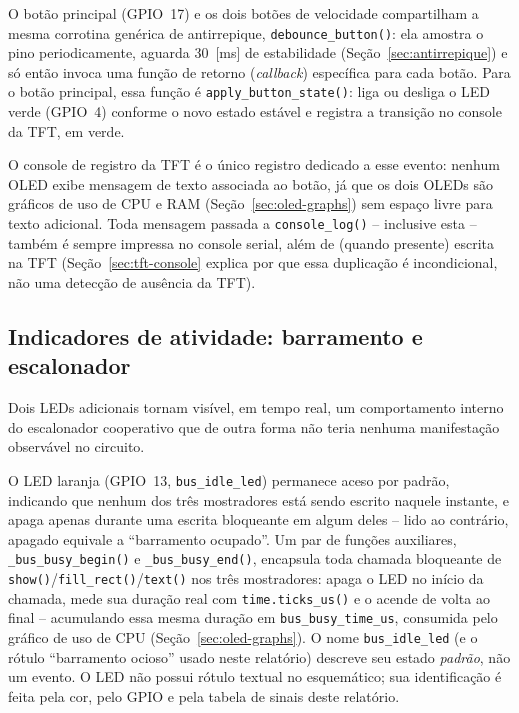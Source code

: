 \documentclass[12pt,a4paper]{article}
\begin{document}
O botão principal (GPIO~17) e os dois botões de velocidade compartilham a mesma corrotina genérica de antirrepique, \texttt{debounce\_button()}: ela amostra o pino periodicamente, aguarda 30~[ms] de estabilidade (Seção~\ref{sec:antirrepique}) e só então invoca uma função de retorno (\textit{callback}) específica para cada botão. Para o botão principal, essa função é \texttt{apply\_button\_state()}: liga ou desliga o LED verde (GPIO~4) conforme o novo estado estável e registra a transição no console da TFT, em verde.

O console de registro da TFT é o único registro dedicado a esse evento: nenhum OLED exibe mensagem de texto associada ao botão, já que os dois OLEDs são gráficos de uso de CPU e RAM (Seção~\ref{sec:oled-graphs}) sem espaço livre para texto adicional. Toda mensagem passada a \texttt{console\_log()} -- inclusive esta -- também é sempre impressa no console serial, além de (quando presente) escrita na TFT (Seção~\ref{sec:tft-console} explica por que essa duplicação é incondicional, não uma detecção de ausência da TFT).

\subsection{Indicadores de atividade: barramento e escalonador}
\label{sec:idle-leds}

Dois LEDs adicionais tornam visível, em tempo real, um comportamento interno do escalonador cooperativo que de outra forma não teria nenhuma manifestação observável no circuito.

O LED laranja (GPIO~13, \texttt{bus\_idle\_led}) permanece aceso por padrão, indicando que nenhum dos três mostradores está sendo escrito naquele instante, e apaga apenas durante uma escrita bloqueante em algum deles -- lido ao contrário, apagado equivale a \enquote{barramento ocupado}. Um par de funções auxiliares, \texttt{\_bus\_busy\_begin()} e \texttt{\_bus\_busy\_end()}, encapsula toda chamada bloqueante de \texttt{show()}/\texttt{fill\_rect()}/\texttt{text()} nos três mostradores: apaga o LED no início da chamada, mede sua duração real com \texttt{time.ticks\_us()} e o acende de volta ao final -- acumulando essa mesma duração em \texttt{bus\_busy\_time\_us}, consumida pelo gráfico de uso de CPU (Seção~\ref{sec:oled-graphs}). O nome \texttt{bus\_idle\_led} (e o rótulo \enquote{barramento ocioso} usado neste relatório) descreve seu estado \emph{padrão}, não um evento. O LED não possui rótulo textual no esquemático; sua identificação é feita pela cor, pelo GPIO e pela tabela de sinais deste relatório.
\end{document}
